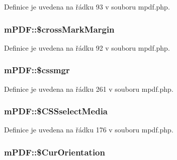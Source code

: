 Definice je uvedena na řádku 93 v souboru mpdf.\-php.

\hypertarget{classm_p_d_f_acb2567dec101768890eceed784d47560}{
\subsubsection[{\$cross\-Mark\-Margin}]{\setlength{\rightskip}{0pt plus 5cm}m\-P\-D\-F\-::\$cross\-Mark\-Margin}}\label{classm_p_d_f_acb2567dec101768890eceed784d47560}


Definice je uvedena na řádku 92 v souboru mpdf.\-php.

\hypertarget{classm_p_d_f_ac57042abadacc8f32da9b2797e008f61}{
\subsubsection[{\$cssmgr}]{\setlength{\rightskip}{0pt plus 5cm}m\-P\-D\-F\-::\$cssmgr}}\label{classm_p_d_f_ac57042abadacc8f32da9b2797e008f61}


Definice je uvedena na řádku 261 v souboru mpdf.\-php.

\hypertarget{classm_p_d_f_a19c7a2fe29b1d85b5cc4ff6eaa355d31}{
\subsubsection[{\$\-C\-S\-Sselect\-Media}]{\setlength{\rightskip}{0pt plus 5cm}m\-P\-D\-F\-::\$\-C\-S\-Sselect\-Media}}\label{classm_p_d_f_a19c7a2fe29b1d85b5cc4ff6eaa355d31}


Definice je uvedena na řádku 176 v souboru mpdf.\-php.

\hypertarget{classm_p_d_f_a09b90148400929d9125ab00049e3d5fa}{
\subsubsection[{\$\-Cur\-Orientation}]{\setlength{\rightskip}{0pt plus 5cm}m\-P\-D\-F\-::\$\-Cur\-Orientation}}\label{classm_p_d_f_a09b90148400929d9125ab00049e3d5fa}


